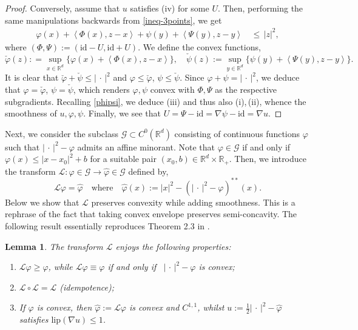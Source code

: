 \documentclass[11pt,letterpaper,reqno]{amsart}
\newtheorem{lemma}[theorem]{Lemma}
\theoremstyle{definition}
\numberwithin{equation}{section}
\def\f{\varphi}
\newcommand{\R}{\mathbb{R}}
\newcommand{\Rd}{\R^d}
\newcommand{\ident}{{\mathrm{id}}}
\newcommand{\LL}{\mathcal{L}}
\newcommand{\argu}{{\,\cdot\,}}
\newcommand{\pairing}[1]{{\left \langle #1 \right \rangle}}
\newcommand{\abs}[1]{{\left \lvert #1 \right \rvert}}
\newcommand{\Lip}{{\mathrm{lip}}}
\newcommand{\G}{\mathcal{G}}
\newcommand{\C}{{C}}
\begin{document}
{\begin{proof}
	Conversely, assume that $u$ satisfies (iv) for some $U$. Then, performing the same manipulations backwards from \eqref{ineq-3points},  we get
		\begin{align*}
		\f(x) + \pairing{ \Phi(x), z-x} +  \psi(y) + \pairing{ \Psi(y), z-y} &\, \le \, |z|^2,
	\end{align*}
	where  $(\Phi,\Psi):=( \ident - U, \ident + U)$.
	We define the convex functions,
	\begin{equation*}
		\check{\f}(z): = \sup_{x \in \Rd} \Big\{	\f(x) + \pairing{ \Phi(x), z-x}  \Big\}, \quad 	\check{\psi}(z) := \sup_{y \in \Rd} \Big\{	\psi(y) + \pairing{ \Psi(y), z-y}  \Big\}.
	\end{equation*}
	It is clear that $\check{\f}+\check{\psi} \leq \abs{\argu}^2$ and ${\f} \leq \check\f$, ${\psi} \leq \check\psi$. Since $\f +\psi = \abs{\argu}^2$, we deduce that ${\f} = \check\f$, ${\psi} = \check\psi$, which renders $\varphi,\psi$ convex with $\Phi,\Psi$ as the respective subgradients. Recalling \eqref{phipsi}, we deduce (iii) and thus also (i),\,(ii),  whence the smoothness of $u, \varphi,\psi$.  Finally, we see that $U = \Psi - \ident = \nabla \psi - \ident = \nabla u$.
\end{proof}
	\color{black}

Next, we consider the subclass $\G\subset \C^0(\R^d)$ consisting of  continuous functions $\f$ such that $|\argu|^2 -\f$ admits an affine minorant. Note that $\f\in\G$ if and only if $\f(x) \le \abs{x-x_0}^2 + b $ for a suitable pair $(x_0,b)\in \R^d\times \R_+$.
Then, we introduce the transform $\LL : \f\in \G\to \hat\f\in\G$ defined by,
\begin{equation} \label{hatfi}
	\LL \f = \hat \f \quad \text{where}\quad \hat\f (x) := \abs{x}^2  -(\abs{\argu}^2-\varphi)^{**}(x) .
\end{equation}
Below we show that $\LL$ preserves convexity while adding smoothness. This is a rephrase of the fact that taking convex envelope preserves semi-concavity. The following result essentially reproduces Theorem 2.3 in \cite{azagra2018}.
\begin{lemma} \label{fundamental}
	\label{lem:LL} The transform $\LL$ enjoys the following properties:
	\begin{enumerate}[label={(\roman*)}] 
		\item $\LL \f \ge \f$, while $\LL\f \equiv  \f$ if and only if \	$\abs{\argu}^2-\varphi$ is convex;
		\item $\LL \circ \LL =\LL$ (idempotence);
		\item If $\f$ is convex, then   $\hat\f:= \LL \f$ is convex and $C^{1,1}$, whilst $u:= \frac{1}{2} \abs{\argu}^2 -\hat\f$ satisfies $\Lip(\nabla u)\le 1$.
	\end{enumerate}
\end{lemma}

}
\end{document}
